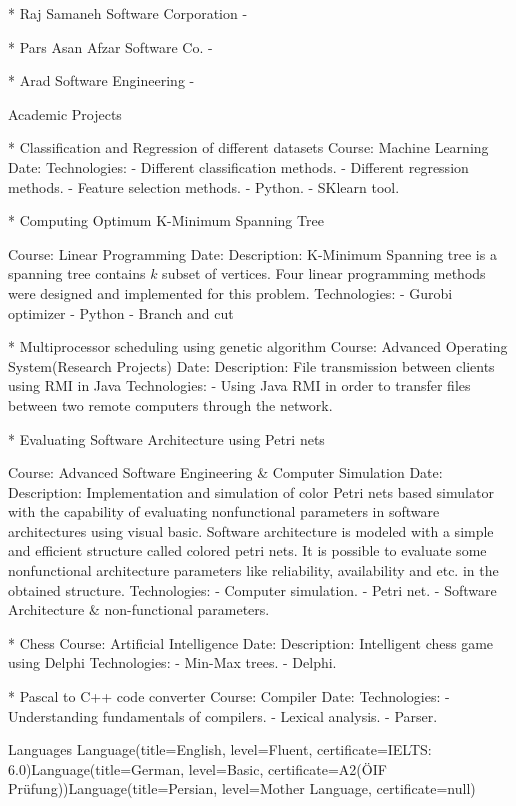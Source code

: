 {* Raj Samaneh Software Corporation
    - 

* Pars Asan Afzar Software Co.
    - 

* Arad Software Engineering 
    - 


Academic Projects

* Classification and Regression of different datasets
Course: Machine Learning
Date: 
Technologies:
- Different classification methods.
- Different regression methods.
- Feature selection methods.
- Python.
- SKlearn tool.

* Computing Optimum K-Minimum Spanning Tree

Course: Linear Programming
Date: 
    Description: K-Minimum Spanning tree is a spanning tree contains $k$ subset of vertices.
Four linear programming methods were designed and implemented for this problem.
Technologies:
- Gurobi optimizer
- Python
- Branch and cut


* Multiprocessor scheduling using genetic algorithm
Course: Advanced Operating System(Research Projects)
Date: 
    Description: File transmission between clients using RMI in Java
Technologies:
- Using Java RMI in order to transfer files between two remote computers through the network.

* Evaluating Software Architecture using Petri nets

Course: Advanced Software Engineering & Computer Simulation
Date: 
    Description: Implementation and simulation of color Petri nets based simulator with the capability of evaluating nonfunctional parameters in software architectures using visual basic. Software architecture is modeled with a simple and efficient structure called colored petri nets. It is possible to evaluate some nonfunctional architecture parameters like reliability, availability and etc. in the obtained structure.
Technologies:
- Computer simulation.
- Petri net.
- Software Architecture & non-functional parameters.

* Chess
Course: Artificial Intelligence
Date: 
    Description: Intelligent chess game using Delphi
Technologies:
- Min-Max trees.
- Delphi.

* Pascal to C++ code converter
Course: Compiler
Date: 
Technologies:
- Understanding fundamentals of compilers.
- Lexical analysis.
- Parser.



Languages
Language(title=English, level=Fluent, certificate=IELTS: 6.0)Language(title=German, level=Basic, certificate=A2(ÖIF Prüfung))Language(title=Persian, level=Mother Language, certificate=null)

}
